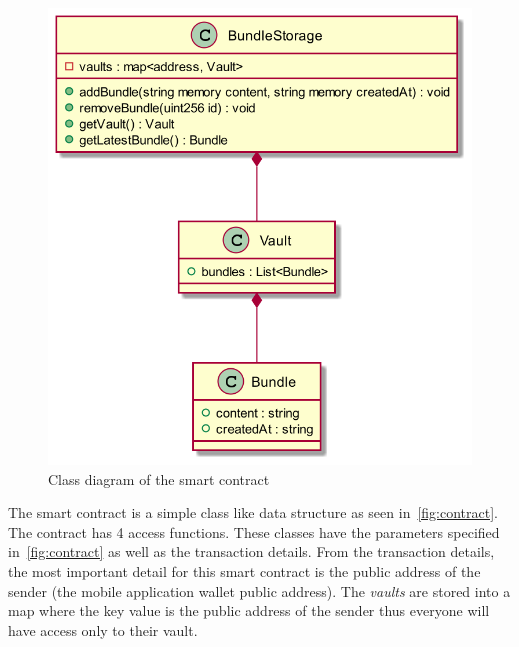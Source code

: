 \documentclass[a4paper,12pt]{report}
\begin{document}
\begin{figure}[H]
    \centering
    \includegraphics[scale=0.4]{diagrams/class/contract.png}
    \caption{Class diagram of the smart contract}\label{fig:contract}
\end{figure}

The smart contract is a simple class like data structure as seen
in~\autoref{fig:contract}. The contract has 4 access functions. These classes
have the parameters specified in~\autoref{fig:contract} as well as the
transaction details. From the transaction details, the most important detail
for this smart contract is the public address of the sender (the mobile
application wallet public address). The \textit{vaults} are stored into a map
where the key value is the public address of the sender thus everyone will have
access only to their vault.
\end{document}
